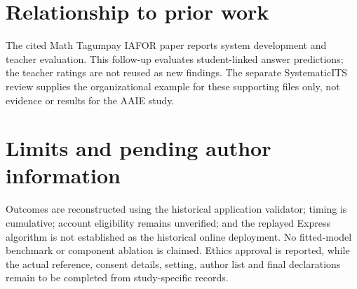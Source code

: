 \documentclass[11pt]{article}
\begin{document}
\section*{Relationship to prior work}
The cited Math Tagumpay IAFOR paper reports system development and teacher
evaluation. This follow-up evaluates student-linked answer predictions; the
teacher ratings are not reused as new findings. The separate SystematicITS review
supplies the organizational example for these supporting files only, not evidence
or results for the AAIE study.
\section*{Limits and pending author information}
Outcomes are reconstructed using the historical application validator; timing is
cumulative; account eligibility remains unverified; and the replayed Express
algorithm is not established as the historical online deployment. No fitted-model
benchmark or component ablation is claimed. Ethics approval is reported, while
the actual reference, consent details, setting, author list and final declarations
remain to be completed from study-specific records.
\end{document}
